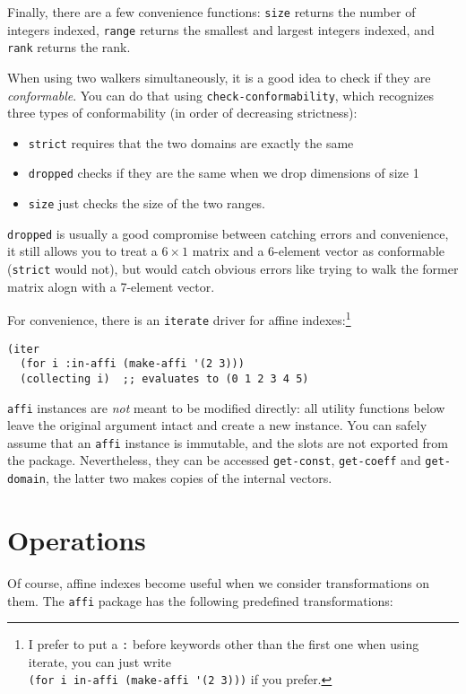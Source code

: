 \documentclass[letterpaper,11pt]{article}
\begin{document}
Finally, there are a few convenience functions: \lstinline!size!
returns the number of integers indexed, \lstinline!range! returns the
smallest and largest integers indexed, and \lstinline!rank! returns
the rank.

When using two walkers simultaneously, it is a good idea to check if
they are \emph{conformable}.  You can do that using
\lstinline!check-conformability!, which recognizes three types of
conformability (in order of decreasing strictness):
\begin{itemize}
\item  \lstinline!strict! requires that the two domains are
exactly the same
\item \lstinline!dropped! checks if they are the same when we drop
dimensions of size 1
\item \lstinline!size! just checks the size of the two ranges.
\end{itemize}
\lstinline!dropped! is usually a good compromise between catching
errors and convenience, it still allows you to treat a $6\times1$
matrix and a 6-element vector as conformable (\lstinline!strict! would
not), but would catch obvious errors like trying to walk the former
matrix alogn with a 7-element vector.

For convenience, there is an \lstinline!iterate! driver for affine
indexes:\footnote{I prefer to put a \lstinline!:! before keywords
  other than the first one when using iterate, you can just write\\
  \lstinline!(for i in-affi (make-affi '(2 3)))! if you prefer.}
\begin{lstlisting}
(iter
  (for i :in-affi (make-affi '(2 3)))
  (collecting i)  ;; evaluates to (0 1 2 3 4 5)
\end{lstlisting}


\lstinline!affi! instances are \emph{not} meant to be modified
directly: all utility functions below leave the original argument
intact and create a new instance.  You can safely assume that an
\lstinline!affi! instance is immutable, and the slots are not exported
from the package.  Nevertheless, they can be accessed
\lstinline!get-const!, \lstinline!get-coeff! and
\lstinline!get-domain!, the latter two makes copies of the internal
vectors.

\section{Operations}
\label{sec:operations}

Of course, affine indexes become useful when we consider
transformations on them.  The \lstinline!affi! package has the
following predefined transformations:
\end{document}
